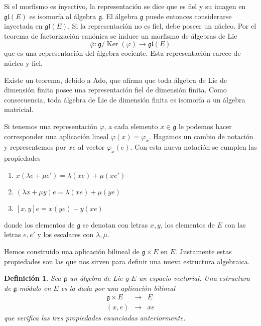 \documentclass[a4paper,draft,12pt]{article}
\newtheorem{defi}{Definición}[section]%
\newcommand{\g}{\mathfrak{g}}%
\newcommand{\lto}{\longrightarrow}%
\newcommand{\df}[1]{\textsf{\color{blue}#1}}
\DeclareMathOperator{\Ker}{Ker}%
\begin{document}
Si el morfismo es inyectivo, la representación se dice que es  \df{fiel}  y su imagen en $\mathfrak{gl}(E)$ es isomorfa al álgebra $\g$.  El álgebra $\g$ puede entonces considerarse inyectada en $\mathfrak{gl}(E)$.
Si la representación no es fiel, debe poseer un núcleo.  Por el teorema de factorización canónica se induce un morfismo de álgebras de Lie
$$
\overline{\varphi} :\g/\Ker(\varphi) \lto \mathfrak{gl}(E)
$$
que es una representación del álgebra cociente.  Esta representación carece de núcleo y fiel.

\bigskip


Existe un teorema, debido a Ado, que afirma que toda álgebra de Lie de dimensión finita posee una representación fiel de dimensión finita.  Como consecuencia, toda álgebra de Lie de dimensión finita es isomorfa a un álgebra matricial.

\bigskip

Si tenemos una representación $\varphi$, a cada elemento $x \in \g$ le podemos hacer corresponder una aplicación lineal $\varphi(x)= \varphi_x$.  Hagamos un cambio de notación y representemos por $xe$ al vector $\varphi_x(e)$.  Con esta nueva notación se cumplen las propiedades

\begin{enumerate}[\indent 1.- ]

\item $x (\lambda e+ \mu e')= \lambda(xe)+ \mu (xe')$

\item $(\lambda x+ \mu y)e = \lambda(xe) + \mu(ye)$

\item $[x,y]e= x(ye)-y(xe)$

\end{enumerate}
donde los elementos de $\g$ se denotan con letras $x,y$, los elementos de $E$ con las letras $e,e'$ y los escalares con $\lambda, \mu$.

Hemos construido una aplicación bilineal de $\g \times E$ en $E$.  Justamente estas propiedades son las que nos sirven para definir una nueva estructura algebraica.

\begin{defi}

Sea $\g$ un álgebra de Lie y $E$ un espacio vectorial.  Una estructura de $\g$-módulo en $E$ es la dada por una aplicación bilineal
$$
\begin{array}{ccl}
\g \times E & \lto& E \\
(x,e)& \lto & xe
\end{array}
$$
que verifica las tres propiedades enunciadas anteriormente.

\end{defi}
\end{document}
